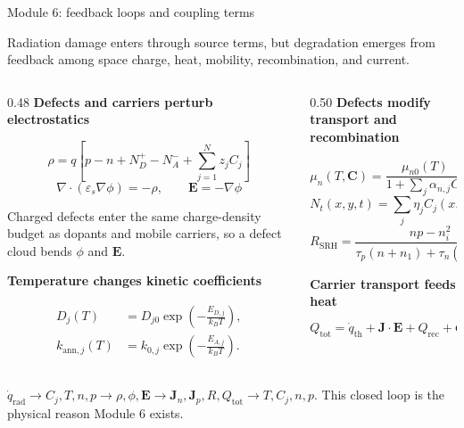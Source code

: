 \documentclass[aspectratio=169,9pt]{beamer}
\newcommand{\Cvec}{\bm{C}}
\newcommand{\Evec}{\bm{E}}
\newcommand{\Jvec}{\bm{J}}
\newcommand{\Jn}{\bm{J}_n}
\newcommand{\Jp}{\bm{J}_p}
\newcommand{\qrad}{\dot{q}_{\mathrm{rad}}}
\newcommand{\qth}{\dot{q}_{\mathrm{th}}}
\newcommand{\grad}{\nabla}
\newcommand{\diverg}{\nabla\!\cdot}
\newcommand{\epss}{\varepsilon_s}
\begin{document}
\begin{frame}{Module 6: feedback loops and coupling terms}
\footnotesize

\begin{bluebox}
\centering\small
Radiation damage enters through source terms, but degradation emerges from feedback among space charge, heat, mobility, recombination, and current.
\end{bluebox}

\vspace{1.2mm}
\begin{columns}[T,totalwidth=\textwidth]
\begin{column}{0.48\textwidth}
\textbf{Defects and carriers perturb electrostatics}
\begin{bluebox}
\scriptsize
\[
\rho=q\left[p-n+N_D^+-N_A^-+
\sum_{j=1}^{N}z_jC_j\right]
\]
\[
\diverg(\epss\grad\phi)=-\rho,
\qquad \Evec=-\grad\phi
\]
\end{bluebox}
\small
Charged defects enter the same charge-density budget as dopants and mobile carriers, so a defect cloud bends \(\phi\) and \(\Evec\).

\vspace{1mm}
\textbf{Temperature changes kinetic coefficients}
\begin{orangebox}
\scriptsize
\begin{align*}
D_j(T)&=D_{j0}\exp\!\left(-\frac{E_{D,j}}{k_BT}\right),\\[-1mm]
k_{\mathrm{ann},j}(T)&=k_{0,j}\exp\!\left(-\frac{E_{A,j}}{k_BT}\right).
\end{align*}
\end{orangebox}
\end{column}

\begin{column}{0.50\textwidth}
\textbf{Defects modify transport and recombination}
\begin{greenbox}
\scriptsize
\[
\mu_n(T,\Cvec)=\frac{\mu_{n0}(T)}{1+\sum_j\alpha_{n,j}C_j},
\qquad
\mu_p(T,\Cvec)=\frac{\mu_{p0}(T)}{1+\sum_j\alpha_{p,j}C_j}
\]
\[
N_t(x,y,t)=\sum_j\eta_j C_j(x,y,t)
\]
\[
R_{\mathrm{SRH}}=
\frac{np-n_i^2}{\tau_p(n+n_1)+\tau_n(p+p_1)}
\]
\end{greenbox}

\vspace{0.5mm}
\textbf{Carrier transport feeds heat}
\begin{purplebox}
\scriptsize
\[
Q_{\mathrm{tot}}=\qth+\Jvec\!\cdot\!\Evec+Q_{\mathrm{rec}}+Q_{\mathrm{def}}+Q_{\mathrm{ext}}
\]
\end{purplebox}
\end{column}
\end{columns}

\vspace{1.1mm}
\begin{greenbox}
\centering\scriptsize
\(\qrad \rightarrow C_j,T,n,p \rightarrow \rho,\phi,\Evec \rightarrow \Jn,\Jp,R,Q_{\mathrm{tot}} \rightarrow T,C_j,n,p\). This closed loop is the physical reason Module 6 exists.
\end{greenbox}
\end{frame}
\end{document}
